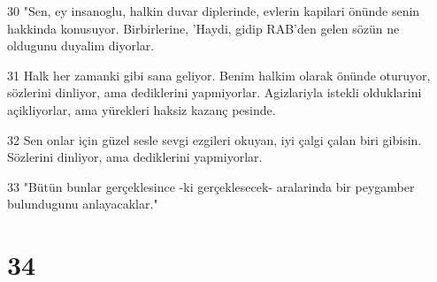 \par 30 "Sen, ey insanoglu, halkin duvar diplerinde, evlerin kapilari önünde senin hakkinda konusuyor. Birbirlerine, 'Haydi, gidip RAB'den gelen sözün ne oldugunu duyalim diyorlar.
\par 31 Halk her zamanki gibi sana geliyor. Benim halkim olarak önünde oturuyor, sözlerini dinliyor, ama dediklerini yapmiyorlar. Agizlariyla istekli olduklarini açikliyorlar, ama yürekleri haksiz kazanç pesinde.
\par 32 Sen onlar için güzel sesle sevgi ezgileri okuyan, iyi çalgi çalan biri gibisin. Sözlerini dinliyor, ama dediklerini yapmiyorlar.
\par 33 "Bütün bunlar gerçeklesince -ki gerçeklesecek- aralarinda bir peygamber bulundugunu anlayacaklar."

\chapter{34}

